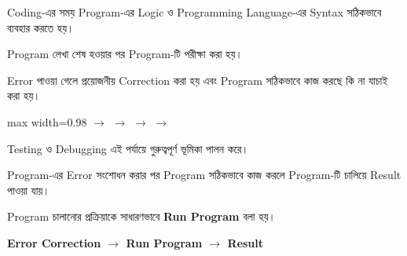 Coding-এর সময় Program-এর Logic ও Programming Language-এর
Syntax সঠিকভাবে ব্যবহার করতে হয়।


Program লেখা শেষ হওয়ার পর Program-টি পরীক্ষা করা হয়।

Error পাওয়া গেলে প্রয়োজনীয় Correction করা হয় এবং Program
সঠিকভাবে কাজ করছে কি না যাচাই করা হয়।

\begin{center}
\begin{adjustbox}{max width=0.98\linewidth}
\(\longrightarrow\)
\(\longrightarrow\)
\(\longrightarrow\)
\(\longrightarrow\)
\end{adjustbox}
\end{center}

Testing ও Debugging এই পর্যায়ে গুরুত্বপূর্ণ ভূমিকা পালন করে।


Program-এর Error সংশোধন করার পর Program সঠিকভাবে কাজ করলে
Program-টি চালিয়ে Result পাওয়া যায়।

Program চালানোর প্রক্রিয়াকে সাধারণভাবে
\textbf{Run Program} বলা হয়।

\begin{center}

\textbf{
Error Correction
\(\longrightarrow\)
Run Program
\(\longrightarrow\)
Result
}

\end{center}


